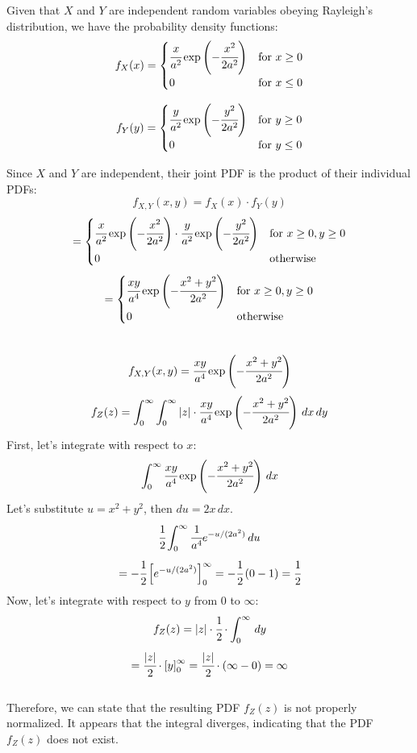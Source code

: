 \documentclass{article}
\begin{document}
\begin{enumerate}
    Given that \( X \) and \( Y \) are independent random variables obeying Rayleigh's distribution, we have the probability density functions:
    \[ 
        f_X(x) = \begin{cases} \cfrac{x}{a^2} \exp\left(-\cfrac{x^2}{2a^2}\right) & \text{for } x \geq 0 \\ 0 & \text{for } x \leq 0 \end{cases} \]

    \[ 
        f_Y(y) = \begin{cases} \cfrac{y}{a^2} \exp\left(-\cfrac{y^2}{2a^2}\right) & \text{for } y \geq 0 \\ 0 & \text{for } y \leq 0 \end{cases} \]

    Since \( X \) and \( Y \) are independent, their joint PDF is the product of their individual PDFs:
    \[ 
        f_{X,Y}(x, y) = f_X(x) \cdot f_Y(y) 
    \]
    \[ 
        = \begin{cases} \cfrac{x}{a^2} \exp\left(-\cfrac{x^2}{2a^2}\right) \cdot \cfrac{y}{a^2} \exp\left(-\cfrac{y^2}{2a^2}\right) & \text{for } x \geq 0, y \geq 0 \\ 0 & \text{otherwise} \end{cases}
    \]
    \[ 
        = \begin{cases} \cfrac{xy}{a^4} \exp\left(-\cfrac{x^2 + y^2}{2a^2}\right) & \text{for } x \geq 0, y \geq 0 \\ 0 & \text{otherwise} \end{cases} 
    \]\\
    \[ 
        f_{X,Y}(x, y) = \cfrac{xy}{a^4} \exp\left(-\cfrac{x^2 + y^2}{2a^2}\right)
    \]
    \[ 
        f_Z(z) = \int_{0}^{\infty} \int_{0}^{\infty} |z| \cdot \cfrac{xy}{a^4} \exp\left(-\cfrac{x^2 + y^2}{2a^2}\right) \,dx \,dy
    \]
    First, let's integrate with respect to \( x \):
    \[ 
        \int_{0}^{\infty} \cfrac{xy}{a^4} \exp\left(-\cfrac{x^2 + y^2}{2a^2}\right) \,dx
    \]
    Let's substitute \( u = x^2 + y^2 \), then \( du = 2x \,dx \).
    \[ 
        \cfrac{1}{2} \int_{0}^{\infty} \cfrac{1}{a^4} e^{-u/(2a^2)} \,du 
    \]
    \[ 
        = -\cfrac{1}{2} \left[ e^{-u/(2a^2)} \right]_{0}^{\infty} = -\cfrac{1}{2} \left(0 - 1\right) = \cfrac{1}{2} 
    \]
    Now, let's integrate with respect to \( y \) from 0 to \( \infty \):
    \[ 
        f_Z(z) = |z| \cdot \cfrac{1}{2} \cdot \int_{0}^{\infty} \,dy
    \]
    \[ 
        = \cfrac{|z|}{2} \cdot \left[y\right]_{0}^{\infty} = \cfrac{|z|}{2} \cdot \left(\infty - 0\right) = \infty
    \]\\
    Therefore, we can state that the resulting PDF \( f_Z(z) \) is not properly normalized. It appears that the integral diverges, indicating that the PDF \( f_Z(z) \) does not exist.


\end{enumerate}
\end{document}
